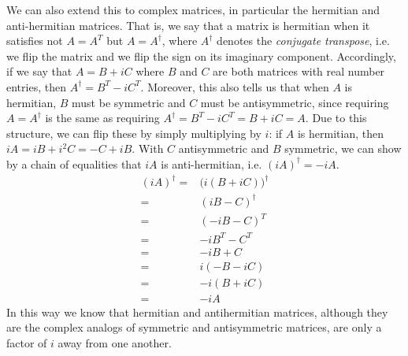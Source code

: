 \documentclass[11pt]{article}
\begin{document}
We can also extend this to complex matrices, in particular the hermitian and anti-hermitian matrices. That is, we say that a matrix is hermitian when it satisfies not $A = A^T$ but $A = A^\dagger$, where $A^\dagger$ denotes the \emph{conjugate transpose}, i.e. we flip the matrix and we flip the sign on its imaginary component. Accordingly, if we say that $A = B + iC$ where $B$ and $C$ are both matrices with real number entries, then $A^\dagger = B^T - iC^T$. Moreover, this also tells us that when $A$ is hermitian, $B$ must be symmetric and $C$ must be antisymmetric, since requiring $A=A^\dagger$ is the same as requiring $A^\dagger = B^T - iC^T = B + iC = A$. Due to this structure, we can flip these by simply multiplying by $i$: if $A$ is hermitian, then $iA = iB + i^2C = -C + iB$. With $C$ antisymmetric and $B$ symmetric, we can show by a chain of equalities that $iA$ is anti-hermitian, i.e. $(iA)^\dagger = -iA$.
\begin{align*}
(iA)^\dagger =& \big(i(B + iC)\big)^\dagger\\
=& (iB - C)^\dagger \\
=& (-iB - C)^T \\
=& -iB^T - C^T \\
=& -iB + C \\
=& i( -B - iC) \\
=& -i (B + iC) \\
=& -iA
\end{align*}
 In this way we know that hermitian and antihermitian matrices, although they are the complex analogs of symmetric and antisymmetric matrices, are only a factor of $i$ away from one another.
 
\end{document}

